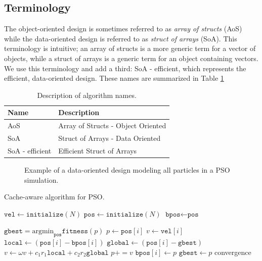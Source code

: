 \subsection{Terminology}
The object-oriented design is sometimes referred to as \emph{array of structs} (AoS) while
the data-oriented design is referred to as \emph{struct of arrays} (SoA). This
terminology is intuitive; an array of structs is a more generic term for a
vector of objects, while a struct of arrays is a generic term for an object
containing vectors.
We use this terminology and add a third: SoA - efficient, which
represents the efficient, data-oriented design. These names are summarized in
Table \ref{tab:names}

\begin{table}
  \centering
  \caption{Description of algorithm names.}
  \label{tab:names}
  \begin{tabular}{ll}\toprule
    \textbf{Name} & \textbf{Description}\\\midrule
    AoS & Array of Structs - Object Oriented\\
    SoA & Struct of Arrays - Data Oriented\\
    SoA - efficient & Efficient Struct of Arrays\\\bottomrule
  \end{tabular}
\end{table}

          

\begin{figure}
  
  \caption{Example of a data-oriented design modeling all particles in a PSO
    simulation.}\label{fig:particles}
\end{figure}

\begin{algorithm}
  \caption{Cache-aware algorithm for PSO.}\label{alg:pso-cache}
  \begin{algorithmic}[1]
    \State $\texttt{vel} \gets \texttt{initialize}(N)$ 
    \State $\texttt{pos} \gets \texttt{initialize}(N)$ 
    \State $\texttt{bpos} \gets \texttt{pos}$ 

    \Repeat
    \State $\texttt{gbest} = \text{argmin}_{\texttt{pos}}\texttt{fitness}(p)$
    \State $p \gets \texttt{pos}[i]$
    \State $v \gets \texttt{vel}[i]$
    \State $\texttt{local} \gets (\texttt{pos}[i] -
    \texttt{bpos}[i])$
    \State $\texttt{global} \gets  (\texttt{pos}[i]
    - \texttt{gbest})$
    \State $v \gets \omega v + c_1 r_1 \texttt{local}  + c_2 r_2 \texttt{global}$
    \State $p += v$
      \State $\texttt{bpos}[i] \gets p$
      \State $\texttt{gbest} \gets p$
      \EndIf
    \EndIf
    \EndFor
    \Until convergence
    \EndProcedure
  \end{algorithmic}
\end{algorithm}

